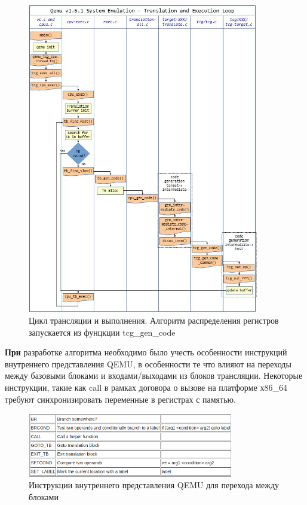 \begin{figure}[h!]
    \centering
    \includegraphics[width=0.9\textwidth]{qemu_graph.jpg}
    \caption{Цикл трансляции и выполнения. Алгоритм распределения регистров запускается из фунцкции tcg\_gen\_code}
\end{figure}

\newpage


\textbf{При}
разработке алгоритма необходимо было учесть особенности инструкций внутреннего представления QEMU, в особенности те что влияют на переходы между базовыми блоками и входами/выходами из блоков трансляции. Некоторые инструкции, такие как call в рамках договора о вызове на платформе х86\_64 требуют синхронизировать переменные в регистрах с памятью.

\begin{figure}[h!]
    \centering
    \includegraphics[width=0.8\textwidth]{table_flow.png}
    \caption{Инструкции внутреннего представления QEMU для перехода между блоками}
\end{figure}

